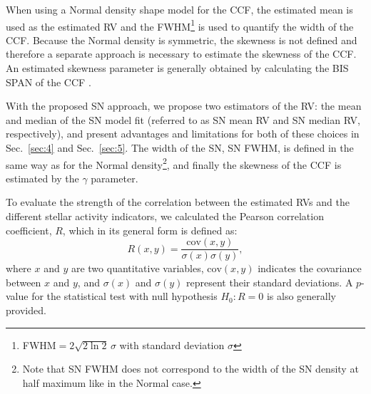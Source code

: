 \documentclass{aa}
\begin{document}

When using a Normal density shape model for the CCF, the estimated mean is used as the estimated RV and the FWHM\footnote{FWHM$=2\sqrt{2\ln2}\,\sigma$ with standard deviation $\sigma$} is used to quantify the width of the CCF.
Because the Normal density is symmetric, the skewness is not defined and therefore a separate approach is necessary to estimate the skewness of the CCF.
An estimated skewness parameter is generally obtained by calculating the BIS SPAN of the CCF \citep[see Sec.~\ref{intro}, and e.g.][]{Queloz-2001}. 
%

With the proposed SN approach, we propose two estimators of the RV: the mean and median of the SN model fit (referred to as SN mean RV and SN median RV, respectively), and present advantages and limitations for both of these choices in Sec.~\ref{sec:4} and Sec.~\ref{sec:5}. 
The width of the SN, SN FWHM, is defined in the same way as for the Normal density\footnote{Note that SN FWHM does not correspond to the width of the SN density at half maximum like in the Normal case.}, and finally the skewness of the CCF is estimated by the $\gamma$ parameter.

To evaluate the strength of the correlation between the estimated RVs and the different stellar activity indicators, we calculated the Pearson correlation coefficient, $R$, which in its general form is defined as:
%
\begin{equation}
R (x,y)= \frac{\text{cov}(x,y)}{\sigma(x)\sigma(y)},
\label{eq:Pearson:corr}
\end{equation}
%
where $x$ and $y$ are two quantitative variables, $\text{cov}(x,y)$ indicates the covariance between $x$ and $y$, and $\sigma(x)$ and $\sigma(y)$ represent their standard deviations.  A $p$-value for the statistical test with null hypothesis $H_{0}: R=0$ is also generally provided.
\end{document}
